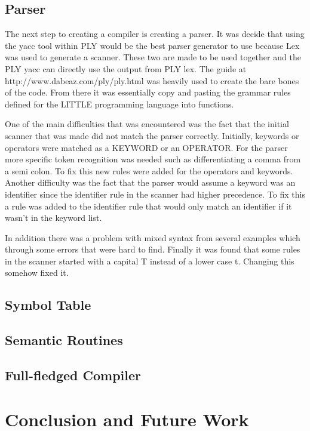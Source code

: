 \documentclass[11pt, oneside]{article}   	%
\begin{document}
	
\subsection{Parser}
The next step to creating a compiler is creating a parser. It was decide that using the yacc
tool within PLY would be the best parser generator to use because Lex was used to generate a
scanner. These two are made to be used together and the PLY yacc can directly use the output
from PLY lex. The guide at http://www.dabeaz.com/ply/ply.html was heavily used to create the
bare bones of the code. From there it was essentially copy and pasting the grammar rules defined
for the LITTLE programming language into functions.

One of the main difficulties that was encountered was the fact that the initial scanner that was
made did not match the parser correctly. Initially, keywords or operators were matched as a
KEYWORD or an OPERATOR. For the parser more specific token recognition was needed such
as differentiating a comma from a semi colon. To fix this new rules were added for the operators
and keywords. Another difficulty was the fact that the parser would assume a keyword was an
identifier since the identifier rule in the scanner had higher precedence. To fix this a rule was
added to the identifier rule that would only match an identifier if it wasn't in the keyword list.

In addition there was a problem with mixed syntax from several examples which through some
errors that were hard to find. Finally it was found that some rules in the scanner started with a
capital T instead of a lower case t. Changing this somehow fixed it.
\subsection{Symbol Table}
\subsection{Semantic Routines}
\subsection{Full-fledged Compiler}

\section{Conclusion and Future Work}

\end{document}
